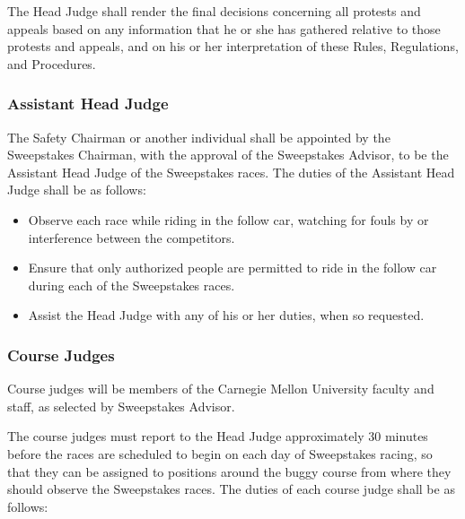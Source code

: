 	The Head Judge shall render the final decisions concerning all protests and appeals based on any information that he or she has gathered relative to those protests and appeals, and on his or her interpretation of these Rules, Regulations, and Procedures.


\subsubsection{Assistant Head Judge}

	The Safety Chairman or another individual shall be appointed by the Sweepstakes Chairman, with the approval of the Sweepstakes Advisor, to be the Assistant Head Judge of the Sweepstakes races. The duties of the Assistant Head Judge shall be as follows:

	\begin{itemize}

		\item Observe each race while riding in the follow car, watching for fouls by or interference between the competitors.

		\item Ensure that only authorized people are permitted to ride in the follow car during each of the Sweepstakes races.

		\item Assist the Head Judge with any of his or her duties, when so requested.

	\end{itemize}

\subsubsection{Course Judges}

	Course judges will be members of the Carnegie Mellon University faculty and staff, as selected by Sweepstakes Advisor.

	The course judges must report to the Head Judge approximately 30 minutes before the races are scheduled to begin on each day of Sweepstakes racing, so that they can be assigned to positions around the buggy course from where they should observe the Sweepstakes races. The duties of each course judge shall be as follows:

